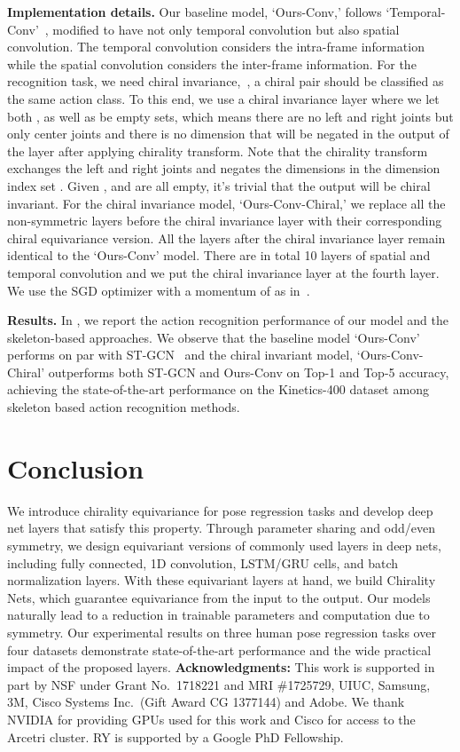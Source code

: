 \documentclass{article}
\begin{document}
\textbf{Implementation details.} Our baseline model, `Ours-Conv,' follows `Temporal-Conv'~\cite{kim2017interpretable}, modified  to have not only temporal convolution but also spatial convolution. The temporal convolution considers the intra-frame information while the spatial convolution considers the inter-frame information. For the recognition task, we need chiral invariance,~\ie, a chiral pair should be classified as the same action class. To this end, we use a chiral invariance layer where we let both ,  as well as   be empty sets, which means there are no left and right joints but only center joints and there is no dimension that will be negated in the output of the layer after applying chirality transform. Note that the chirality transform exchanges the left and right joints and negates the dimensions in the dimension index set . Given ,  and  are all empty, it's trivial that the output will be chiral invariant. For the chiral invariance model, `Ours-Conv-Chiral,' we replace  all the non-symmetric layers before the chiral invariance layer with their corresponding chiral equivariance version. All the layers after the chiral invariance layer remain identical to the `Ours-Conv' model. There are in total 10 layers of spatial and temporal convolution and we put the chiral invariance layer at the fourth layer. We use the SGD optimizer with a momentum of  as in~\cite{yan2018stgcn}. 

\textbf{Results.} In , we report the action recognition performance of our model and the skeleton-based approaches. We observe that the baseline model `Ours-Conv'  performs on par with ST-GCN~\cite{yan2018stgcn} and the chiral invariant model, `Ours-Conv-Chiral' outperforms both ST-GCN and Ours-Conv on Top-1 and Top-5 accuracy, achieving the state-of-the-art performance on the Kinetics-400 dataset among skeleton based action recognition methods. 
 \section{Conclusion}
\label{sec:conc}
We introduce  chirality equivariance for pose regression tasks and develop deep net layers that satisfy this property. Through parameter sharing and odd/even symmetry, we design equivariant versions of  commonly used layers in deep nets, including fully connected, 1D convolution, LSTM/GRU cells, and batch normalization layers. With these equivariant layers at hand, we build Chirality Nets, which guarantee  equivariance from the input to the output. Our models naturally lead to a reduction in trainable parameters and computation due to symmetry. Our experimental results on three human pose regression tasks over four datasets demonstrate state-of-the-art performance and the wide practical impact of the proposed layers.  
\vspace{12pt}
\noindent\textbf{Acknowledgments:}
This work is supported in part by NSF under Grant No.\ 1718221 and MRI \#1725729, UIUC, Samsung, 3M, Cisco Systems Inc.\ (Gift Award CG 1377144) and Adobe. We thank NVIDIA for providing GPUs used for this work and Cisco for access to the Arcetri cluster. RY is supported by a Google PhD Fellowship.
\end{document}
